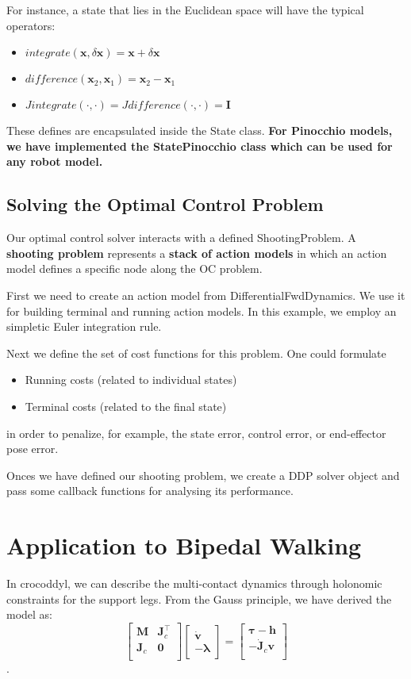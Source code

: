 For instance, a state that lies in the Euclidean space will have the typical operators:
\begin{itemize}
\item $integrate(\mathbf{x},\delta\mathbf{x}) = \mathbf{x} + \delta\mathbf{x}$
\item $difference(\mathbf{x}_2,\mathbf{x}_1) = \mathbf{x}_2 - \mathbf{x}_1$
\item $Jintegrate(\cdot,\cdot) = Jdifference(\cdot,\cdot) = \mathbf{I}$
\end{itemize}

These defines are encapsulated inside the State class. \textbf{For Pinocchio models, we have implemented the StatePinocchio class which can be used for any robot model.}

\subsection{Solving the Optimal Control Problem}
Our optimal control solver interacts with a defined ShootingProblem. A \textbf{shooting problem} represents a \textbf{stack of action models} in which an action model defines a specific node along the OC problem.

First we need to create an action model from DifferentialFwdDynamics. We use it for building terminal and running action models. In this example, we employ an simpletic Euler integration rule.

Next we define the set of cost functions for this problem. One could formulate
\begin{itemize}
\item Running costs (related to individual states)
\item Terminal costs (related to the final state)
\end{itemize}
in order to penalize, for example, the state error, control error, or end-effector pose error. 

Onces we have defined our shooting problem, we create a DDP solver object and pass some callback functions for analysing its performance.


\section{Application to Bipedal Walking}
In crocoddyl, we can describe the multi-contact dynamics through holonomic constraints for the support legs. From the Gauss principle, we have derived the model as:
$$
\left[\begin{matrix}
 \mathbf{M} & \mathbf{J}^{\top}_c \\
 {\mathbf{J}_{c}} & \mathbf{0} \\
\end{matrix}\right]
\left[\begin{matrix}
 \dot{\mathbf{v}} \\ -\boldsymbol{\lambda}
\end{matrix}\right]
 = 
\left[\begin{matrix}
  \boldsymbol{\tau} - \mathbf{h} \\
  -\dot{\mathbf{J}}_c \mathbf{v} \\
\end{matrix}\right]$$.

